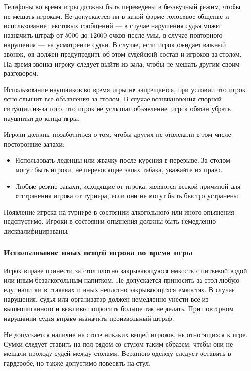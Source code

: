 Телефоны во время игры должны быть переведены в беззвучный режим, чтобы не мешать игрокам. Не допускается ни в какой форме голосовое общение и использование текстовых сообщений --- в случае нарушения судья может назначить штраф от 8000 до 12000 очков после умы, в случае повторного нарушения --- на усмотрение судьи. В случае, если игрок ожидает важный звонок, он должен предупредить об этом судейский состав и игроков за столом. На время звонка игроку следует выйти из зала, чтобы не мешать другим своим разговором.

Использование наушников во время игры не запрещается, при условии что игрок ясно слышит все объявления за столом. В случае возникновения спорной ситуации из-за того, что игрок не услышал объявление, игрок обязан убрать наушники до конца игры.

Игроки должны позаботиться о том, чтобы других не отвлекали в том числе посторонние запахи:
\begin{itemize}
	\item Использовать леденцы или жвачку после курения в перерыве. За столом могут быть игроки, не переносящие запах табака, уважайте их право.
	\item Любые резкие запахи, исходящие от игрока, являются веской причиной для отстранения игрока от турнира, если они не могут быть быстро устранены.
\end{itemize}

Появление игрока на турнире в состоянии алкогольного или иного опьянения недопустимо. Игроки в состоянии опьянения должны быть немедленно дисквалифицированы.

\subsubsection{Использование иных вещей игрока во время игры}

Игрок вправе принести за стол плотно закрывающуюся емкость с питьевой водой или иным безалкогольным напитком. Не допускается приносить за стол любую еду, напитки в стаканах и иных неплотно закрывающихся емкостях. В случае нарушения, судья или организатор должен немедленно унести все из вышеописанного и вежливо попросить больше так не делать. При повторном нарушении судья вправе назначить произвольный штраф.

Не допускается наличие на столе никаких вещей игроков, не относящихся к игре. Сумки следует ставить на пол рядом со стулом таким образом, чтобы они не мешали проходу судей между столами. Верхнюю одежду следует оставить в гардеробе, но также допустимо повесить на стул.

